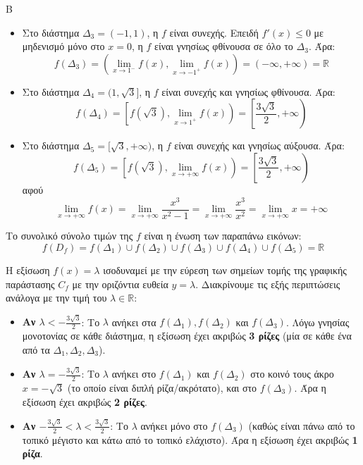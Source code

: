 \begin{thema}{Β}
\begin{erwthma}
\begin{itemize}
    \item Στο διάστημα $\Delta_3 = (-1, 1)$, η $f$ είναι συνεχής. Επειδή $f'(x) \leq 0$ με μηδενισμό μόνο στο $x=0$, η $f$ είναι γνησίως φθίνουσα σε όλο το $\Delta_3$. Άρα:
    \[ f(\Delta_3) = \left( \lim_{x \to 1^-} f(x), \lim_{x \to -1^+} f(x) \right) = (-\infty, +\infty) = \mathbb{R} \]
    
    \item Στο διάστημα $\Delta_4 = (1, \sqrt{3}]$, η $f$ είναι συνεχής και γνησίως φθίνουσα. Άρα:
    \[ f(\Delta_4) = \left[ f(\sqrt{3}), \lim_{x \to 1^+} f(x) \right) = \left[ \frac{3\sqrt{3}}{2}, +\infty \right) \]
    
    \item Στο διάστημα $\Delta_5 = [\sqrt{3}, +\infty)$, η $f$ είναι συνεχής και γνησίως αύξουσα. Άρα:
    \[ f(\Delta_5) = \left[ f(\sqrt{3}), \lim_{x \to +\infty} f(x) \right) = \left[ \frac{3\sqrt{3}}{2}, +\infty \right) \]
αφού \[\lim\limits_{x\to+\infty}{f(x)}=\lim\limits_{x\to+\infty}{\frac{x^3}{x^2-1}}=\lim\limits_{x\to+\infty}{\frac{x^3}{x^2}}=\lim\limits_{x\to+\infty}{x}=+\infty\]
\end{itemize}

Το συνολικό σύνολο τιμών της $f$ είναι η ένωση των παραπάνω εικόνων:
\[ f(D_f) = f(\Delta_1) \cup f(\Delta_2) \cup f(\Delta_3) \cup f(\Delta_4) \cup f(\Delta_5) = \mathbb{R} \]

Η εξίσωση $f(x) = \lambda$ ισοδυναμεί με την εύρεση των σημείων τομής της γραφικής παράστασης $C_f$ με την οριζόντια ευθεία $y = \lambda$. Διακρίνουμε τις εξής περιπτώσεις ανάλογα με την τιμή του $\lambda \in \mathbb{R}$:

\begin{itemize}
    \item \textbf{Αν $\lambda < -\frac{3\sqrt{3}}{2}$}: 
    Το $\lambda$ ανήκει στα $f(\Delta_1), f(\Delta_2)$ και $f(\Delta_3)$. Λόγω γνησίας μονοτονίας σε κάθε διάστημα, η εξίσωση έχει ακριβώς \textbf{3 ρίζες} (μία σε κάθε ένα από τα $\Delta_1, \Delta_2, \Delta_3$).
    
    \item \textbf{Αν $\lambda = -\frac{3\sqrt{3}}{2}$}: 
    Το $\lambda$ ανήκει στο $f(\Delta_1)$ και $f(\Delta_2)$ στο κοινό τους άκρο $x = -\sqrt{3}$ (το οποίο είναι διπλή ρίζα/ακρότατο), και στο $f(\Delta_3)$. Άρα η εξίσωση έχει ακριβώς \textbf{2 ρίζες}.
    
    \item \textbf{Αν $-\frac{3\sqrt{3}}{2} < \lambda < \frac{3\sqrt{3}}{2}$}: 
    Το $\lambda$ ανήκει μόνο στο $f(\Delta_3)$ (καθώς είναι πάνω από το τοπικό μέγιστο και κάτω από το τοπικό ελάχιστο). Άρα η εξίσωση έχει ακριβώς \textbf{1 ρίζα}.
    

\end{itemize}
\end{erwthma}
\end{thema}
